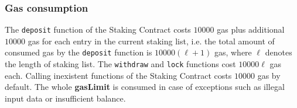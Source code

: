 \subsubsection{Gas consumption}

The {\tt deposit} function of the Staking Contract costs $10000$ gas plus additional $10000$ gas for each entry in the current staking list, i.e. the total amount of consumed gas by the {\tt deposit} function is $10000(\ell+1)$ gas, where $\ell$ denotes the length of staking list.
The {\tt withdraw} and {\tt lock} functions cost $10000\ell$ gas each. 
Calling inexistent functions of the Staking Contract costs $10000$ gas by default.
The whole {\bf gasLimit} is consumed in case of exceptions such as illegal input data or insufficient balance.

